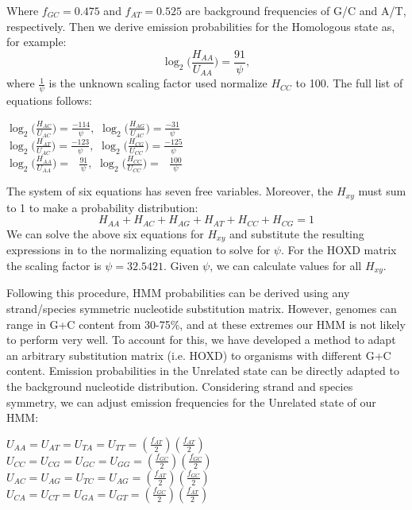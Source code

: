 \documentclass{llncs}
\begin{document}
Where $f_{GC}=0.475$ and $f_{AT}=0.525$ are background frequencies of
G/C and A/T, respectively.  Then we derive emission probabilities for
the Homologous state as, for example:
\begin{equation}
\log_{2}\bigg(\frac{H_{AA}}{U_{AA}}\bigg) = \frac{91}{\psi},
\end{equation}
where $\frac{1}{\psi}$ is the unknown scaling factor used normalize $H_{CC}$ to 100. The full list of equations follows:
\begin{center}
$\log_{2}\bigg(\frac{H_{AC}}{U_{AC}}\bigg) = \frac{-114}{\psi},$
$\log_{2}\bigg(\frac{H_{AG}}{U_{AC}}\bigg) = \frac{-31}{\psi}$ \\
$\log_{2}\bigg(\frac{H_{AT}}{U_{AC}}\bigg) = \frac{-123}{\psi},$
$\log_{2}\bigg(\frac{H_{CG}}{U_{CC}}\bigg) = \frac{-125}{\psi}$ \\
$\log_{2}\bigg(\frac{H_{AA}}{U_{AA}}\bigg) = \ \ \ \frac{91}{\psi},$
$\log_{2}\bigg(\frac{H_{CC}}{U_{CC}}\bigg) = \ \ \ \frac{100}{\psi}$ \\
\end{center}

The system of six equations has seven free variables.  Moreover, the $H_{xy}$ must sum to 1 to make a probability distribution:
\begin{equation}
H_{AA} + H_{AC} + H_{AG} + H_{AT} + H_{CC} + H_{CG} = 1
\end{equation}
We can solve the above six equations for $H_{xy}$ and substitute the
resulting expressions in to the normalizing equation to solve for
$\psi$. For the HOXD matrix the scaling factor is $\psi=32.5421$. Given
$\psi$, we can calculate values for all $H_{xy}$.

Following this procedure, HMM probabilities can be derived using any
strand/species symmetric nucleotide substitution matrix. However,
genomes can range in G+C content from 30-75\%, and at these extremes
our HMM is not likely to perform very well.  To account for this, we
have developed a method to adapt an arbitrary substitution matrix
(i.e. HOXD) to organisms with different G+C content.  Emission
probabilities in the Unrelated state can be directly adapted to the
background nucleotide distribution.  Considering strand and species
symmetry, we can adjust emission frequencies for the Unrelated state
of our HMM:
\begin{center}
$U_{AA}=U_{AT}=U_{TA}=U_{TT}=(\frac{f_{AT}}{2})(\frac{f_{AT}}{2})$
$U_{CC}=U_{CG}=U_{GC}=U_{GG}=(\frac{f_{GC}}{2})(\frac{f_{GC}}{2})$
$U_{AC}=U_{AG}=U_{TC}=U_{AG}=(\frac{f_{AT}}{2})(\frac{f_{GC}}{2})$
$U_{CA}=U_{CT}=U_{GA}=U_{GT}=(\frac{f_{GC}}{2})(\frac{f_{AT}}{2})$
\end{center}
\end{document}
